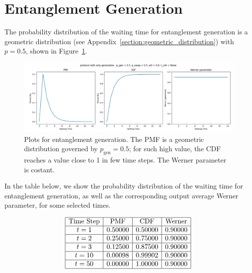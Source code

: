 \documentclass{masterthesis}
\begin{document}
\section{Entanglement Generation}

The probability distribution of the waiting time for entanglement generation is a geometric distribution (see Appendix~\ref{section:geometric_distribution}) with $p = 0.5$, shown in Figure~\ref{fig:gen_waiting_time}.
\begin{figure}[ht]
    \centering
    \includegraphics[width=1\linewidth]{images/dist_tests/only generation.png}
    \caption{Plots for entanglement generation. The PMF is a geometric distribution governed by $p_\text{gen} = 0.5$; for such high value, the CDF reaches a value close to 1 in few time steps. The Werner parameter is costant.}
    \label{fig:gen_waiting_time}
\end{figure}

In the table below, we show the probability distribution of the waiting time for entanglement generation, as well as the corresponding output average Werner parameter, for some selected times.

\begin{equation*}
    \begin{array}{|c|c|c|c|}
        \hline
        \text{Time Step} & \text{PMF} & \text{CDF} & \text{Werner} \\
        \hline
        t = 1 & 0.50000 & 0.50000 & 0.90000 \\
        \hline
        t = 2 & 0.25000 & 0.75000 & 0.90000 \\
        \hline
        t = 3 & 0.12500 & 0.87500 & 0.90000 \\
        \hline
        t = 10 & 0.00098 & 0.99902 & 0.90000 \\
        \hline
        t = 50 & 0.00000 & 1.00000 & 0.90000 \\
        \hline
    \end{array}
    \label{tab:gen_waiting_time}
\end{equation*}
\end{document}
